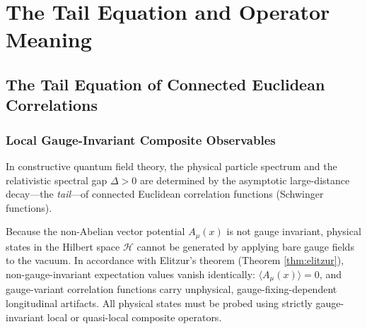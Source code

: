 \chapter{The Tail Equation and Operator Meaning}
\label{ch:tail}
\label{ch:tail_equation}

\section{The Tail Equation of Connected Euclidean Correlations}
\label{sec:tail_equation_def}

\subsection{Local Gauge-Invariant Composite Observables}
\label{subsec:gauge_inv_observables}

In constructive quantum field theory, the physical particle spectrum and the relativistic spectral gap $\Delta > 0$ are determined by the asymptotic large-distance decay—the \emph{tail}—of connected Euclidean correlation functions (Schwinger functions). 

Because the non-Abelian vector potential $A_\mu(x)$ is not gauge invariant, physical states in the Hilbert space $\mathcal{H}$ cannot be generated by applying bare gauge fields to the vacuum. In accordance with Elitzur's theorem (Theorem \ref{thm:elitzur}), non-gauge-invariant expectation values vanish identically: $\langle A_\mu(x) \rangle = 0$, and gauge-variant correlation functions carry unphysical, gauge-fixing-dependent longitudinal artifacts. All physical states must be probed using strictly gauge-invariant local or quasi-local composite operators.

